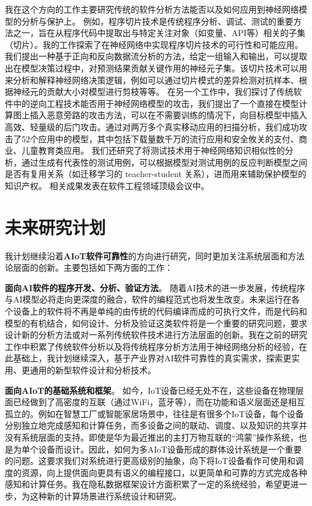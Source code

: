 \documentclass[12pt]{article}
\begin{document}
我在这个方向的工作主要研究传统的软件分析方法能否以及如何应用到神经网络模型的分析与保护上。
例如，程序切片技术是传统程序分析、调试、测试的重要方法之一，旨在从程序代码中提取出与特定关注对象（如变量、API等）相关的子集（切片）。我的工作探索了在神经网络中实现程序切片技术的可行性和可能应用。我们提出一种基于正向和反向数据流分析的方法，给定一组输入和输出，可以提取出在模型决策过程中，对预测结果贡献关键作用的神经元子集。该切片技术可以用来分析和解释神经网络决策逻辑，例如可以通过切片模式的差异检测对抗样本、根据神经元的贡献大小对模型进行剪枝等等。
在另一个工作中，我们探讨了传统软件中的逆向工程技术能否用于神经网络模型的攻击，我们提出了一个直接在模型计算图上插入恶意旁路的攻击方法，可以在不需要训练的情况下，向目标模型中插入高效、轻量级的后门攻击。通过对两万多个真实移动应用的扫描分析，我们成功攻击了52个应用中的模型，其中包括下载量数千万的流行应用和安全攸关的支付、商业、儿童教育类应用。
我们还研究了将测试技术用于神经网络知识相似性的分析，通过生成有代表性的测试用例，可以根据模型对测试用例的反应判断模型之间是否有复用关系（如迁移学习的 teacher-student 关系），进而用来辅助保护模型的知识产权。
相关成果\cite{li2021deeppayload,zhang2020dynamic,li2021modeldiff}发表在软件工程领域顶级会议中。


\section{未来研究计划}

我计划继续沿着\textbf{AIoT软件可靠性}的方向进行研究，同时更加关注系统层面和方法论层面的创新。主要包括如下两方面的工作：


\textbf{面向AI软件的程序开发、分析、验证方法}。
随着AI技术的进一步发展，传统程序与AI模型必将走向更深度的融合，软件的编程范式也将发生改变。未来运行在各个设备上的软件将不再是单纯的由传统的代码编译而成的可执行文件，而是代码和模型的有机结合，如何设计、分析及验证这类软件将是一个重要的研究问题，要求设计新的分析方法或对一系列传统软件技术进行方法层面的创新。我在之前的研究工作中积累了传统软件分析以及将传统程序分析方法用于神经网络分析的经验，在此基础上，我计划继续深入，基于产业界对AI软件可靠性的真实需求，探索更实用、更通用的新型软件设计和分析技术。

\textbf{面向AIoT的基础系统和框架}。
如今，IoT设备已经无处不在，这些设备在物理层面已经做到了高密度的互联（通过WiFi，蓝牙等），而在功能和语义层面还是相互孤立的。例如在智慧工厂或智能家居场景中，往往是有很多个IoT设备，每个设备分别独立地完成感知和计算任务，而多设备之间的联动、调度、以及知识的共享并没有系统层面的支持。即使是华为最近推出的主打万物互联的“鸿蒙”操作系统，也是为单个设备而设计。因此，如何为多AIoT设备形成的群体设计系统是一个重要的问题。这要求我们对系统进行更高级别的抽象，向下将IoT设备看作可使用和调度的资源，向上提供面向更具有语义的编程接口，以更简单和可靠的方式完成各种感知和计算任务。我在隐私数据框架设计方面积累了一定的系统经验，希望更进一步，为这种新的计算场景进行系统设计和研究。
\end{document}
